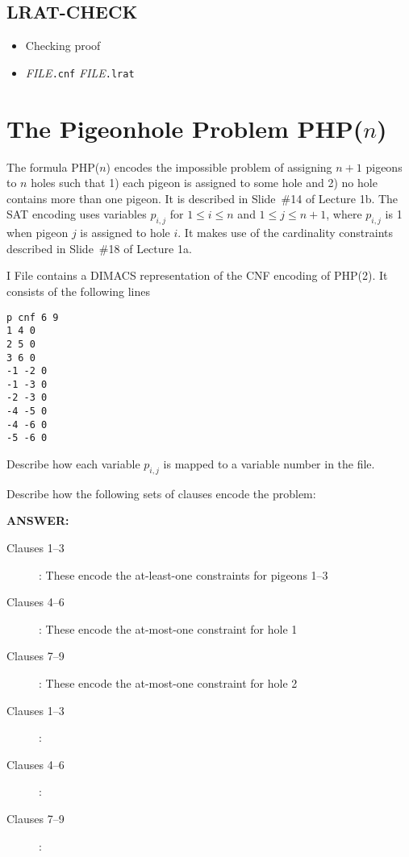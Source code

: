 \subsection*{LRAT-CHECK}

\begin{itemize}
\item Checking proof
\item[] {\it FILE}\texttt{.cnf} {\it FILE}\texttt{.lrat}
\end{itemize}



\newpage

\section*{The Pigeonhole Problem PHP($n$)}


The formula PHP($n$) encodes the impossible problem of assigning $n+1$
pigeons to $n$ holes such that 1) each pigeon is assigned to some hole
and 2) no hole contains more than one pigeon.  It is described in
Slide~\#14 of Lecture 1b.  The SAT encoding uses variables $p_{i,j}$
for $1 \leq i \leq n$ and $1 \leq j \leq n+1$, where $p_{i,j}$ is 1
when pigeon $j$ is assigned to hole $i$.  It makes use of
the cardinality constraints described in Slide~\#18 of Lecture 1a.
\medskip

\begin{problem}{I}
File  contains
a DIMACS representation of the CNF encoding of PHP(2).
It consists of the following lines
\begin{lstlisting}
p cnf 6 9
1 4 0
2 5 0
3 6 0
-1 -2 0
-1 -3 0
-2 -3 0
-4 -5 0
-4 -6 0
-5 -6 0
\end{lstlisting}

\begin{choice}
\item Describe how each variable $p_{i,j}$ is mapped to a variable number in the file.

\item Describe how the following sets of clauses encode the problem:

\ifshowsolutions
$\;$\\[1ex]{\bf ANSWER:}
  \begin{description}
    \item[Clauses 1--3]: These encode the at-least-one constraints for pigeons 1--3
    \item[Clauses 4--6]: These encode the at-most-one constraint for hole 1
    \item[Clauses 7--9]: These encode the at-most-one constraint for hole 2
  \end{description}
\else
  \begin{description}
    \item[Clauses 1--3]:
    \item[Clauses 4--6]:
    \item[Clauses 7--9]:
  \end{description}
\fi
\end{choice}
\end{problem}

